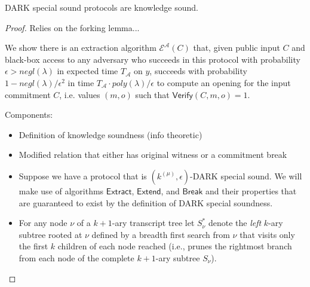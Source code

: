 \begin{theorem} DARK special sound protocols are knowledge sound. 
\end{theorem} 

\begin{proof} Relies on the forking lemma...

We show there is an extraction algorithm $\mathcal{E}^\mathcal{A}(C)$ that, given public input $C$ and black-box access to any adversary who succeeds in this protocol with probability $\epsilon > negl(\lambda)$ in expected time $T_{\mathcal{A}}$ on $y$, succeeds with probability $1 - negl(\lambda)/\epsilon^2$ in time $T_\mathcal{A} \cdot poly(\lambda)/\epsilon$ to compute an opening for the input commitment $C$, i.e. values $(m, o)$ such that $\textsf{Verify}(C, m, o) = 1$.  

Components: 
\begin{itemize} 
\item Definition of knowledge soundness (info theoretic)
\item Modified relation that either has original witness or a commitment break 
\item Suppose we have a protocol that is $(k^{(\mu)}, \epsilon)$-DARK special sound. We will make use of algorithms $\textsf{Extract}$, $\textsf{Extend}$, and $\textsf{Break}$ and their properties that are guaranteed to exist by the definition of DARK special soundness. 
\item For any node $\nu$ of a $k+1$-ary transcript tree let $S^*_\nu$ denote the \emph{left} $k$-ary subtree rooted at $\nu$ defined by a breadth first search from $\nu$ that visits only the first $k$ children of each node reached (i.e., prunes the rightmost branch from each node of the complete $k+1$-ary subtree $S_\nu$).


\end{itemize}
\end{proof}

